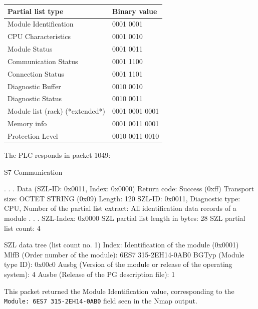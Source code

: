 ﻿\documentclass[../main.tex]{subfiles}
\begin{document}
\begin{enumerate}
\begin{table}[H]
    \centering
    \footnotesize
    \begin{tabular}{|l|l|}
        \hline
        \textbf{Partial list type} & \textbf{Binary value} \\
        \hline
        Module Identification & 0001 0001 \\
        \hline
        CPU Characteristics & 0001 0010 \\
        \hline
        Module Status & 0001 0011 \\
        \hline
        Communication Status & 0001 1100 \\
        \hline
        Connection Status & 0001 1101 \\
        \hline
        Diagnostic Buffer & 0010 0010 \\
        \hline
        Diagnostic Status & 0010 0011 \\
        \hline
        Module list (rack)  (*extended*) & 0001 0001 0001 \\
        \hline
        Memory info & 0001 0011 0001 \\
        \hline
        Protection Level & 0010 0011 0010 \\
        \hline
    \end{tabular}
\end{table}


The PLC responds in packet 1049:


\begin{packetdump}
S7 Communication
    
    . . .
    Data (SZL-ID: 0x0011, Index: 0x0000)
        Return code: Success (0xff)
        Transport size: OCTET STRING (0x09)
        Length: 120
        SZL-ID: 0x0011, Diagnostic type: CPU, Number of the partial list extract: All identification data records of a module
        . . .
        SZL-Index: 0x0000
        SZL partial list length in bytes: 28
        SZL partial list count: 4

        SZL data tree (list count no. 1)
            Index: Identification of the module (0x0001)
            MlfB (Order number of the module): 6ES7 315-2EH14-0AB0 
            BGTyp (Module type ID): 0x00c0
            Ausbg (Version of the module or release of the operating system): 4
            Ausbe (Release of the PG description file): 1
\end{packetdump}


This packet returned the Module Identification value, corresponding to the \texttt{Module: 6ES7 315-2EH14-0AB0} field seen in the Nmap output.



\end{enumerate}
\end{document}
